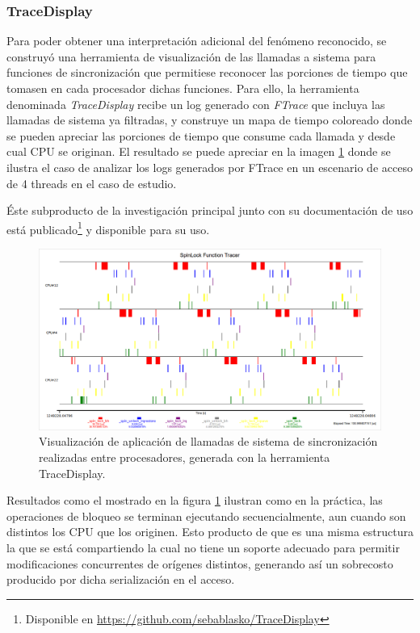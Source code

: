 \subsubsection{TraceDisplay}
Para poder obtener una interpretación adicional del fenómeno reconocido, se construyó una herramienta de visualización de las llamadas a sistema para funciones de sincronización que permitiese reconocer las porciones de tiempo que tomasen en cada procesador dichas funciones. Para ello, la herramienta denominada \emph{TraceDisplay} recibe un log generado con \emph{FTrace} que incluya las llamadas de sistema ya filtradas, y construye un mapa de tiempo coloreado donde se pueden apreciar las porciones de tiempo que consume cada llamada y desde cual CPU se originan. El resultado se puede apreciar en la imagen \ref{fig:traceDisplay} donde se ilustra el caso de analizar los logs generados por FTrace en un escenario de acceso de 4 threads en el caso de estudio.

Éste subproducto de la investigación principal junto con su documentación de uso está publicado\footnote{Disponible en \url{https://github.com/sebablasko/TraceDisplay}} y disponible para su uso.

\begin{figure}[!h]
	\centering
	\includegraphics[scale=0.34]{imagenes/traceVisualization.png}
	\caption{Visualización de aplicación de llamadas de sistema de sincronización realizadas entre procesadores, generada con la herramienta TraceDisplay.}
	\label{fig:traceDisplay}
\end{figure}

Resultados como el mostrado en la figura \ref{fig:traceDisplay} ilustran como en la práctica, las operaciones de bloqueo se terminan ejecutando secuencialmente, aun cuando son distintos los CPU que los originen. Esto producto de que es una misma estructura la que se está compartiendo la cual no tiene un soporte adecuado para permitir modificaciones concurrentes de orígenes distintos, generando así un sobrecosto producido por dicha serialización en el acceso.


